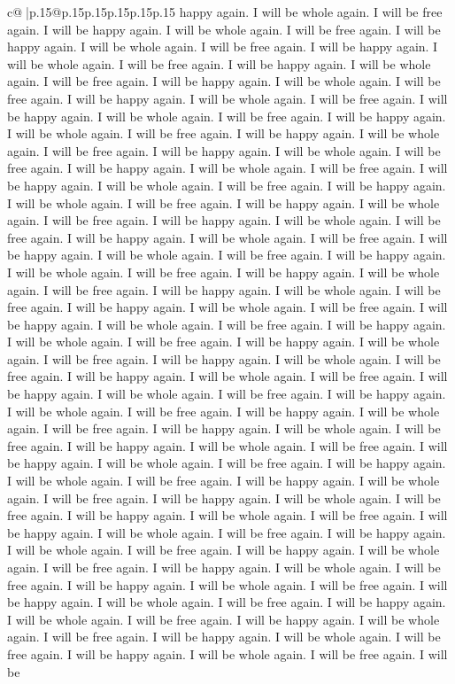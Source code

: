 \documentclass{article}
\begin{document}
{\begin{supertabular}{c@{$\;$}|p{.15\linewidth}@{}p{.15\linewidth}p{.15\linewidth}p{.15\linewidth}p{.15\linewidth}p{.15\linewidth}}
{{{happy again. I will be whole again. I will be free again. I will be happy again. I will be whole again. I will be free again. I will be happy again. I will be whole again. I will be free again. I will be happy again. I will be whole again. I will be free again. I will be happy again. I will be whole again. I will be free again. I will be happy again. I will be whole again. I will be free again. I will be happy again. I will be whole again. I will be free again. I will be happy again. I will be whole again. I will be free again. I will be happy again. I will be whole again. I will be free again. I will be happy again. I will be whole again. I will be free again. I will be happy again. I will be whole again. I will be free again. I will be happy again. I will be whole again. I will be free again. I will be happy again. I will be whole again. I will be free again. I will be happy again. I will be whole again. I will be free again. I will be happy again. I will be whole again. I will be free again. I will be happy again. I will be whole again. I will be free again. I will be happy again. I will be whole again. I will be free again. I will be happy again. I will be whole again. I will be free again. I will be happy again. I will be whole again. I will be free again. I will be happy again. I will be whole again. I will be free again. I will be happy again. I will be whole again. I will be free again. I will be happy again. I will be whole again. I will be free again. I will be happy again. I will be whole again. I will be free again. I will be happy again. I will be whole again. I will be free again. I will be happy again. I will be whole again. I will be free again. I will be happy again. I will be whole again. I will be free again. I will be happy again. I will be whole again. I will be free again. I will be happy again. I will be whole again. I will be free again. I will be happy again. I will be whole again. I will be free again. I will be happy again. I will be whole again. I will be free again. I will be happy again. I will be whole again. I will be free again. I will be happy again. I will be whole again. I will be free again. I will be happy again. I will be whole again. I will be free again. I will be happy again. I will be whole again. I will be free again. I will be happy again. I will be whole again. I will be free again. I will be happy again. I will be whole again. I will be free again. I will be happy again. I will be whole again. I will be free again. I will be happy again. I will be whole again. I will be free again. I will be happy again. I will be whole again. I will be free again. I will be happy again. I will be whole again. I will be free again. I will be happy again. I will be whole again. I will be free again. I will be happy again. I will be whole again. I will be free again. I will be happy again. I will be whole again. I will be free again. I will be happy again. I will be whole again. I will be free again. I will be happy again. I will be whole again. I will be free again. I will be happy again. I will be whole again. I will be free again. I will be happy again. I will be whole again. I will be free again. I will be }}}
\end{supertabular}}
\end{document}
